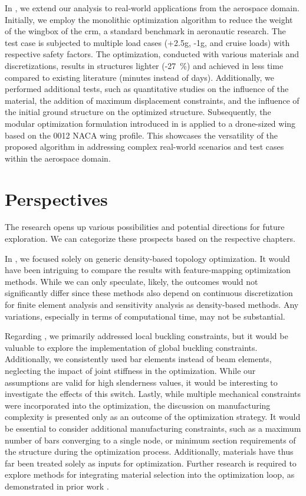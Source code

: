 In , we extend our analysis to real-world applications from the aerospace domain. Initially, we employ the monolithic optimization algorithm to reduce the weight of the wingbox of the \gls{crm}, a standard benchmark in aeronautic research. The test case is subjected to multiple load cases (+2.5g, -1g, and cruise loads) with respective safety factors. The optimization, conducted with various materials and discretizations, results in structures lighter (-\qty{27}{\%}) and achieved in less time compared to existing literature (minutes instead of days). Additionally, we performed additional tests, such as quantitative studies on the influence of the material, the addition of maximum displacement constraints, and the influence of the initial ground structure on the optimized structure.  Subsequently, the modular optimization formulation introduced in  is applied to a drone-sized wing based on the 0012 NACA wing profile. This showcases the versatility of the proposed algorithm in addressing complex real-world scenarios and test cases within the aerospace domain.

\section*{Perspectives}
The research opens up various possibilities and potential directions for future exploration. We can categorize these prospects based on the respective chapters.

In , we focused solely on generic density-based topology optimization. It would have been intriguing to compare the results with feature-mapping optimization methods. While we can only speculate, likely, the outcomes would not significantly differ since these methods also depend on continuous discretization for finite element analysis and sensitivity analysis as density-based methods. Any variations, especially in terms of computational time, may not be substantial.

Regarding , we primarily addressed local buckling constraints, but it would be valuable to explore the implementation of global buckling constraints. Additionally, we consistently used bar elements instead of beam elements, neglecting the impact of joint stiffness in the optimization. While our assumptions are valid for high slenderness values, it would be interesting to investigate the effects of this switch. Lastly, while multiple mechanical constraints were incorporated into the optimization, the discussion on manufacturing complexity is presented only as an outcome of the optimization strategy. It would be essential to consider additional manufacturing constraints, such as a maximum number of bars converging to a single node, or minimum section requirements of the structure during the optimization process. Additionally, materials have thus far been treated solely as inputs for optimization. Further research is required to explore methods for integrating material selection into the optimization loop, as demonstrated in prior work .

